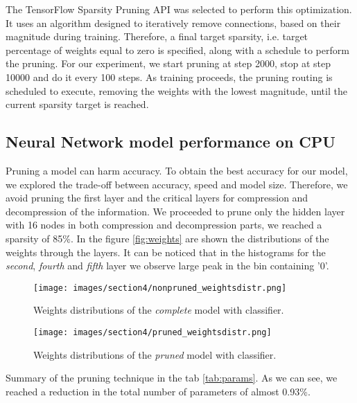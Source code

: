 \documentclass{article}
\begin{document}
\par The TensorFlow Sparsity Pruning API was selected to perform this optimization.
It uses an algorithm designed to iteratively remove connections, based on their magnitude during training.
Therefore, a final target sparsity, i.e. target percentage of weights equal to zero is specified,
along with a schedule to perform the pruning. 
For our experiment, we start pruning at step 2000, stop at step 10000 and do it every 100 steps.
As training proceeds, the pruning routing is scheduled to execute, removing the weights with the lowest magnitude, 
until the current sparsity target is reached.

\subsection{Neural Network model performance on CPU}

\par Pruning a model can harm accuracy. 
To obtain the best accuracy for our model, we explored the trade-off between accuracy, speed and model size.
Therefore, we avoid pruning the first layer and the critical layers for compression and decompression of the information.
We proceeded to prune only the hidden layer with 16 nodes in both compression and decompression parts, we reached a sparsity of 85\%. 
In the figure \ref{fig:weights} are shown the distributions of the weights through the layers.
It can be noticed that in the histograms for the \textit{second}, \textit{fourth} and \textit{fifth} layer we observe large peak in the bin containing '$0$'.

\begin{figure}[H]
  \centering
  \texttt{[image: images/section4/nonpruned\_weightsdistr.png]}
  \caption{Weights distributions of the \textit{complete} model with classifier.}
  \label{fig:nonprun_weights}
\end{figure}

\begin{figure}[H]
  \centering
  \texttt{[image: images/section4/pruned\_weightsdistr.png]}
  \caption{Weights distributions of the \textit{pruned} model with classifier.}
  \label{fig:prun_weights}
\end{figure}



Summary of the pruning technique in the tab \ref{tab:params}. 
As we can see, we reached a reduction in the total number of parameters of almost 0.93\%.
\end{document}
